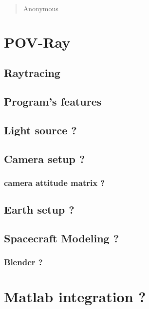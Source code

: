 \begin{quotation}
{\footnotesize
{}
\begin{flushright}
Anonymous
\end{flushright}
}
\end{quotation}
\vspace{0.5cm}

\section{POV-Ray}

\subsection{Raytracing}

\subsection{Program's features}

\subsection{Light source ?}

\subsection{Camera setup ?}

\subsubsection{camera attitude matrix ?}

\subsection{Earth setup ?}

\subsection{Spacecraft Modeling ?}
\subsubsection{Blender ?}

\section{Matlab integration ?}

